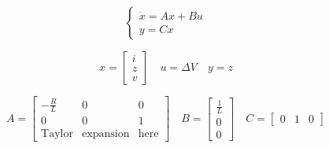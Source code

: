 \begin{equation}
    \begin{cases}
        \dot{x} = A x + B u \\
        y = C x
    \end{cases}
\end{equation}

\begin{equation}
    x = \begin{bmatrix}
        i \\
        z \\
        v
    \end{bmatrix}
    \quad
    u = \Delta V
    \quad
    y = z
\end{equation}

\begin{equation}
    A = \begin{bmatrix}
        -\frac{R}{L}  & 0                & 0           \\
        0             & 0                & 1           \\
        \text{Taylor} & \text{expansion} & \text{here}
    \end{bmatrix}
    \quad
    B = \begin{bmatrix}
        \frac{1}{L} \\
        0           \\
        0
    \end{bmatrix}
    \quad
    C = \begin{bmatrix}
        0 & 1 & 0
    \end{bmatrix}
\end{equation}